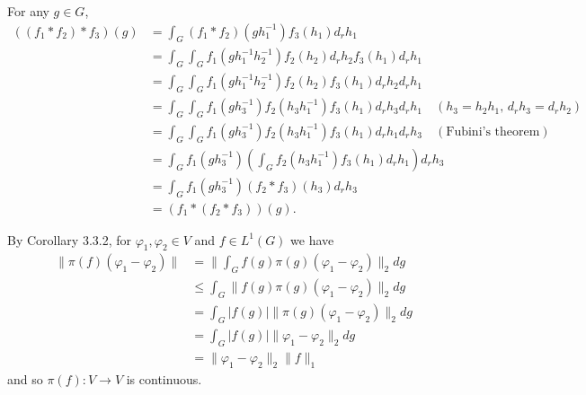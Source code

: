 \begin{problem}
For any $g \in G$,
\begin{align*}
    ((f_1 * f_2) * f_3)(g) &= \int_{G}(f_1 * f_2)(gh_1^{-1})f_{3}(h_{1})d_{r}h_{1} \\
    &= \int_{G} \int_{G} f_{1}(gh_{1}^{-1}h_{2}^{-1})f_{2}(h_{2})d_{r}h_{2}f_{3}(h_{1})d_{r}h_{1} \\
    &= \int_{G} \int_{G} f_{1}(gh_{1}^{-1}h_{2}^{-1})f_{2}(h_{2})f_{3}(h_{1}) d_{r}h_{2} d_{r}h_{1} \\
    &= \int_{G} \int_{G} f_{1}(gh_{3}^{-1})f_{2}(h_{3}h_{1}^{-1})f_{3}(h_{1}) d_{r}h_{3}d_{r}h_{1} \quad (h_{3} = h_{2}h_{1},\,d_{r}h_{3} = d_{r}h_{2}) \\
    &= \int_{G} \int_{G} f_{1}(gh_{3}^{-1})f_{2}(h_{3}h_{1}^{-1})f_{3}(h_{1}) d_{r}h_{1}d_{r}h_{3} \quad (\text{Fubini's theorem}) \\
    &= \int_{G} f_{1}(gh_{3}^{-1}) \left(\int_{G} f_{2}(h_{3}h_{1}^{-1})f_{3}(h_{1}) d_{r}h_{1}\right) d_{r}h_{3} \\
    &= \int_{G} f_{1}(gh_{3}^{-1}) (f_{2} * f_{3})(h_{3})d_{r}h_{3} \\
    &= (f_{1} * (f_{2} * f_{3}))(g).
\end{align*}
\end{problem}

\begin{problem}
By Corollary 3.3.2, for $\varphi_1 ,\varphi_2 \in V$ and $f \in L^1(G)$ we have
\begin{align*}
    \|\pi(f)(\varphi_1 - \varphi_2)\| &= \bigg\|\int_G f(g)\pi(g)(\varphi_1 - \varphi_2)\bigg\|_2 dg \\
    & \leq \int_G \| f(g) \pi(g) (\varphi_1 - \varphi_2)\|_2 dg \\
    & = \int_G |f(g)| \| \pi(g) (\varphi_1 - \varphi_2)\|_2 dg \\
    & = \int_G |f(g)| \| \varphi_1 - \varphi_2 \|_2 dg \\
    &= \| \varphi_1 - \varphi_2\|_2 \|f\|_1
\end{align*}
and so $\pi(f): V \to V$ is continuous.
\end{problem}


